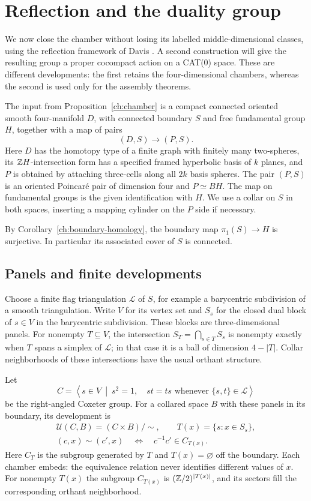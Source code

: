 \section{Reflection and the duality group}
\label{rf:section}

We now close the chamber without losing its labelled middle-dimensional
classes, using the reflection framework of Davis
\cite[Sections~13 and~15, especially Remark~15.9]{Davis1983}.
A second construction will give the resulting group a proper
cocompact action on a CAT(0) space.  These are different developments:
the first retains the four-dimensional chambers, whereas the second is
used only for the assembly theorems.

The input from Proposition~\ref{ch:chamber} is a compact connected oriented
smooth four-manifold $D$, with connected boundary $S$ and free fundamental
group $H$, together with a map of pairs
\[
 (D,S)\longrightarrow(P,S).
\]
Here $D$ has the homotopy type of a finite graph with finitely many
two-spheres, its $\mathbb Z H$-intersection form has a specified framed
hyperbolic basis of $k$ planes, and $P$ is obtained by attaching
three-cells along all $2k$ basis spheres.  The pair $(P,S)$ is an
oriented Poincar\'e pair of dimension four and $P\simeq BH$.
The map on fundamental groups is the given identification with $H$.
We use a collar on $S$ in both spaces, inserting a mapping cylinder
on the $P$ side if necessary.

By Corollary~\ref{ch:boundary-homology}, the boundary map
$\pi_1(S)\to H$ is surjective.  In particular its associated cover of
$S$ is connected.

\subsection{Panels and finite developments}
\label{rf:panels}

Choose a finite flag triangulation $\mathcal L$ of $S$, for example a
barycentric subdivision of a smooth triangulation.  Write $V$ for its
vertex set and $S_s$ for the closed dual block of $s\in V$ in the
barycentric subdivision.  These blocks are three-dimensional panels.
For nonempty $T\subseteq V$, the intersection $S_T=\bigcap_{s\in T}S_s$ is nonempty exactly when
$T$ spans a simplex of $\mathcal L$; in that case it is a ball of
dimension $4-|T|$.  Collar neighborhoods of these intersections have
the usual orthant structure.

Let
\[
 C=\left\langle s\in V\ \middle|\ s^2=1,\quad
 st=ts\text{ whenever }\{s,t\}\in\mathcal L\right\rangle
\]
be the right-angled Coxeter group.  For a collared space $B$ with these
panels in its boundary, its development is
\[
 \begin{gathered}
 \mathcal U(C,B)=(C\times B)/\sim,
 \qquad T(x)=\{s:x\in S_s\},\\
 (c,x)\sim(c',x)\quad\Longleftrightarrow\quad
 c^{-1}c'\in C_{T(x)}.
 \end{gathered}
\]
Here $C_T$ is the subgroup generated by $T$ and $T(x)=\varnothing$
off the boundary.  Each chamber embeds: the equivalence relation never
identifies different values of $x$.  For nonempty $T(x)$ the subgroup
$C_{T(x)}$ is $(\mathbb Z/2)^{|T(x)|}$, and its sectors fill the corresponding
orthant neighborhood.

